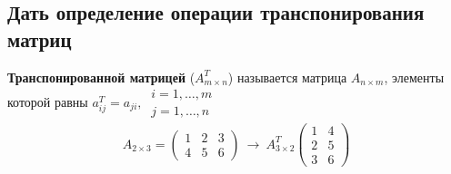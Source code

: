 \subsection{Дать определение операции транспонирования матриц}
\begin{definition*}
	\textbf{Транспонированной матрицей} ($A^T_{m\times n}$) называется матрица $A_{n\times m}$, элементы которой равны $a^T_{ij} = a_{ji},\ \begin{array}{l} i = 1, \ldots , m \\ j = 1, \ldots , n \end{array} $
	\begin{gather*}
		A_{2\times 3} = \begin{pmatrix}
			1 & 2 & 3 \\
			4 & 5 & 6
		\end{pmatrix}\ \longrightarrow\
		A^T_{3\times 2} \begin{pmatrix}
			1 & 4 \\
			2 & 5 \\
			3 & 6
		\end{pmatrix}
	\end{gather*}
\end{definition*}

